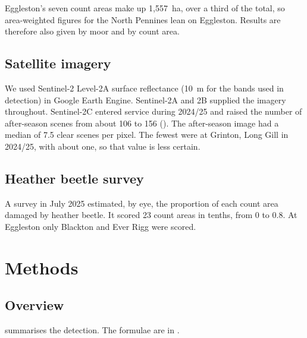 \documentclass[11pt,a4paper]{article}
\begin{document}
Eggleston's seven count areas make up 1,557~ha, over a third of the total, so area-weighted figures for the North Pennines lean on Eggleston. Results are therefore also given by moor and by count area.

\subsection{Satellite imagery}

We used Sentinel-2 Level-2A surface reflectance (10~m for the bands used in detection) in Google Earth Engine. Sentinel-2A and 2B supplied the imagery throughout. Sentinel-2C entered service during 2024/25 and raised the number of after-season scenes from about 106 to 156 (). The after-season image had a median of 7.5 clear scenes per pixel. The fewest were at Grinton, Long Gill in 2024/25, with about one, so that value is less certain.

\subsection{Heather beetle survey}

A survey in July 2025 estimated, by eye, the proportion of each count area damaged by heather beetle. It scored 23 count areas in tenths, from 0 to 0.8. At Eggleston only Blackton and Ever Rigg were scored.

\FloatBarrier
\section{Methods}\label{sec:methods}

\subsection{Overview}

 summarises the detection. The formulae are in .
\end{document}
